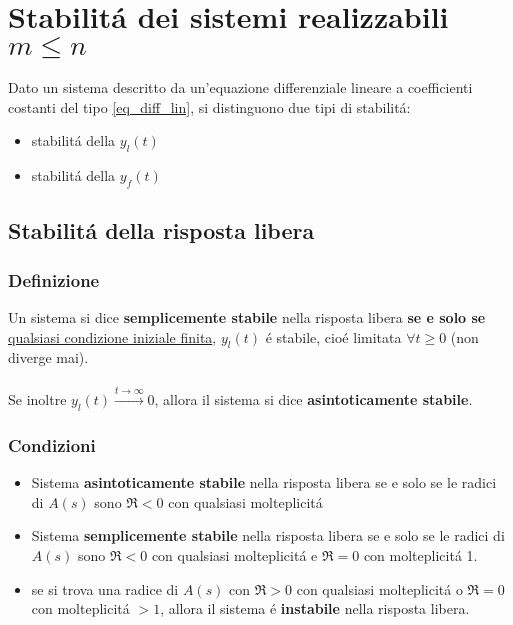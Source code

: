 \documentclass[../main.tex]{subfiles}
\begin{document}
	\section{Stabilit\'{a} dei sistemi realizzabili $ m \leq n $}
		Dato un sistema descritto da un'equazione differenziale lineare a coefficienti costanti del tipo \ref{eq_diff_lin}, si distinguono due tipi di stabilit\'{a}:
		\begin{itemize}
			\item stabilit\'{a} della $ y_l(t) $
			\item stabilit\'{a} della $ y_f(t) $
		\end{itemize}
		
	\subsection{Stabilit\'{a} della risposta libera}
	
	\subsubsection{Definizione}
		Un sistema si dice \textbf{semplicemente stabile} nella risposta libera \textbf{se e solo se} \underline{qualsiasi condizione iniziale finita}, $ y_l(t) $ \'{e} stabile, cio\'{e} limitata $ \forall t \geq 0 $ (non diverge mai).\\
		\smallskip\\
		Se inoltre $ y_l(t) \stackrel{t \to \infty}{\longrightarrow} 0 $, allora il sistema si dice \textbf{asintoticamente stabile}.
	
	\subsubsection{Condizioni}
		\begin{itemize}
			\item
				Sistema \textbf{asintoticamente stabile} nella risposta libera se e solo se le radici di $ A(s) $ sono $ \Re < 0 $ con qualsiasi molteplicit\'{a}
			\item
				Sistema \textbf{semplicemente stabile} nella risposta libera se e solo se le radici di $ A(s) $ sono $ \Re < 0 $ con qualsiasi molteplicit\'{a} e $ \Re = 0 $ con molteplicit\'{a} 1.
			\item
				se si trova una radice di $ A(s) $ con $ \Re > 0 $ con qualsiasi molteplicit\'{a} o $ \Re = 0 $ con molteplicit\'{a} $ >1 $, allora il sistema \'{e} \textbf{instabile} nella risposta libera.
		\end{itemize}
\end{document}
